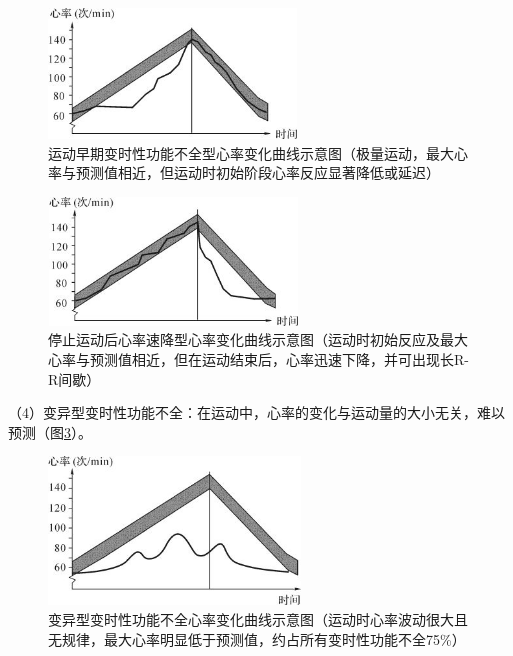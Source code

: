 \begin{figure}[!htbp]
 \centering
 \includegraphics[width=2.59375in,height=1.36458in]{./images/Image00740.jpg}
 \captionsetup{justification=centering}
 \caption{运动早期变时性功能不全型心率变化曲线示意图（极量运动，最大心率与预测值相近，但运动时初始阶段心率反应显著降低或延迟）}
 \label{fig47-3}
  \end{figure} 

\begin{figure}[!htbp]
 \centering
 \includegraphics[width=2.61458in,height=1.34375in]{./images/Image00741.jpg}
 \captionsetup{justification=centering}
 \caption{停止运动后心率速降型心率变化曲线示意图（运动时初始反应及最大心率与预测值相近，但在运动结束后，心率迅速下降，并可出现长R-R间歇）}
 \label{fig47-4}
  \end{figure} 

（4）变异型变时性功能不全：在运动中，心率的变化与运动量的大小无关，难以预测（图\ref{fig47-5}）。

\begin{figure}[!htbp]
 \centering
 \includegraphics[width=2.63542in,height=1.55208in]{./images/Image00742.jpg}
 \captionsetup{justification=centering}
 \caption{变异型变时性功能不全心率变化曲线示意图（运动时心率波动很大且无规律，最大心率明显低于预测值，约占所有变时性功能不全75\%）}
 \label{fig47-5}
  \end{figure} 

